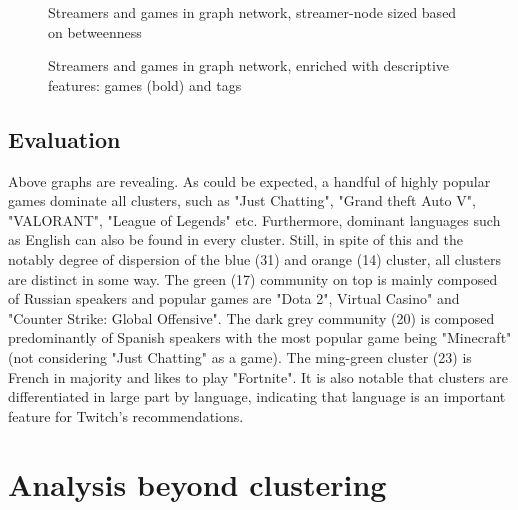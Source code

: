 \documentclass[11pt, oneside]{article}   	%
\begin{document}
\begin{figure}
\centering
\caption{Streamers and games in graph network, streamer-node sized based on betweenness}
\label{figure label}
\end{figure}

\begin{figure}
\centering
\caption{Streamers and games in graph network, enriched with descriptive features: games (bold) and tags}
\label{figure label}
\end{figure}
\subsection{Evaluation}
Above graphs are revealing. As could be expected, a handful of highly popular games dominate all clusters, such as "Just Chatting", "Grand theft Auto V", "VALORANT", "League of Legends" etc. Furthermore, dominant languages such as English can also be found in every cluster.
Still, in spite of this and the notably degree of dispersion of the blue (31) and orange (14) cluster, all clusters are distinct in some way. 
\newline
The green (17) community on top is mainly composed of Russian speakers and popular games are "Dota 2", Virtual Casino" and "Counter Strike: Global Offensive". The dark grey community (20) is composed predominantly of Spanish speakers with the most popular game being "Minecraft" (not considering "Just Chatting" as a game). The ming-green cluster (23) is French in majority and likes to play "Fortnite".
\newline
It is also notable that clusters are differentiated in large part by language, indicating that language is an important feature for Twitch's recommendations. 
\section{Analysis beyond clustering}
\end{document}
